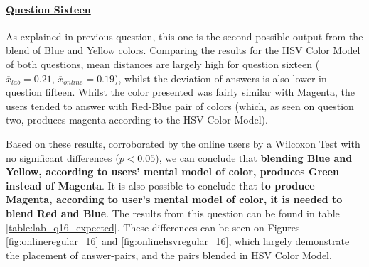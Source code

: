\paragraph{\ul{Question Sixteen}}
%
As explained in previous question, this one is the second possible output from the blend of \ul{Blue and Yellow colors}. Comparing the results for the HSV Color Model of both questions, mean distances are largely high for question sixteen
($\overline{x}_{lab} = 0.21$, $\overline{x}_{online} = 0.19$), whilst the deviation of answers is also lower in question fifteen.
Whilst the color presented was fairly similar with Magenta, the users tended to answer with Red-Blue pair of colors (which, as seen on question two, produces magenta according
to the HSV Color Model). \par
%
Based on these results, corroborated by the online users by a Wilcoxon Test with no significant differences ($p < 0.05$), we can conclude that \textbf{blending Blue and Yellow, according to users' mental model of color, produces Green instead of Magenta}. It is also
possible to conclude that \textbf{to produce Magenta, according to user's mental model of color, it is needed to blend Red and Blue}. The results from
this question can be found in table \ref{table:lab_q16_expected}. These differences can be seen on Figures \ref{fig:onlineregular_16} and \ref{fig:onlinehsvregular_16}, which largely
demonstrate the placement of answer-pairs, and the pairs blended in HSV Color Model.
%
